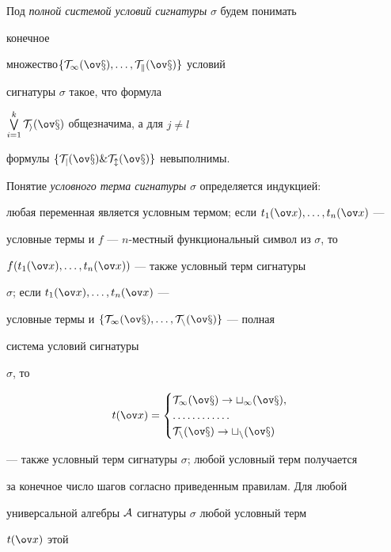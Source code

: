 Под {\it полной системой условий сигнатуры} $\sigma$ будем понимать 


конечное 


множество\linebreak $\{\cal T_1(\ov x),\dotsc,\cal T_k(\ov x)\}$ условий 


сигнатуры $\sigma$ такое, что формула 


$\bigvee\limits^k_{i=1}\cal T_i(\ov x)$ общезначима, а для $j\ne l$ 


формулы $\{\cal T_j(\ov x)\&\cal T_l(\ov x)\}$ невыполнимы. 


Понятие {\it условного терма сигнатуры} $\sigma$ определяется индукцией: 


любая переменная является условным термом; если $t_1(\ov 


x),\dotsc,t_n(\ov x)$ --- 


условные термы и $f$ --- $n$-местный функциональный символ из $\sigma$, то 


$f(t_1(\ov x),\dotsc,t_n(\ov x))$ --- также условный терм сигнатуры 


$\sigma$; если $t_1(\ov x),\dotsc,t_n(\ov x)$ --- 


условные термы и $\{\cal T_1(\ov x),\dotsc,\cal T_n(\ov x)\}$ --- полная 


система условий сигнатуры 


$\sigma$, то 


\begin{equation} 


t(\ov x)= 


\begin{cases} 


\cal T_1(\ov x)\to t_1(\ov x),\\ 


\dotsc\dotsc\dotsc\dotsc\\ 


\cal T_n(\ov x)\to t_n(\ov x) 


\end{cases} 


\end{equation} 


--- также условный терм сигнатуры $\sigma$; любой условный терм получается 


за конечное число шагов согласно приведенным правилам. Для любой 


универсальной алгебры $\cal A$ сигнатуры $\sigma$ любой условный терм 


$t(\ov x)$ этой 


